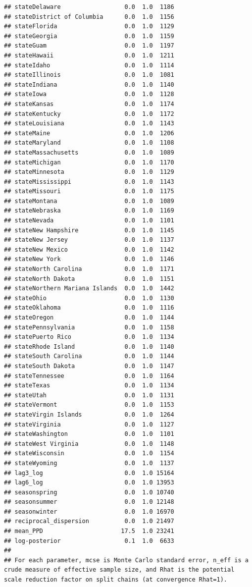 \documentclass[
]{book}
\begin{document}
\begin{verbatim}
## stateDelaware                  0.0  1.0  1186
## stateDistrict of Columbia      0.0  1.0  1156
## stateFlorida                   0.0  1.0  1129
## stateGeorgia                   0.0  1.0  1159
## stateGuam                      0.0  1.0  1197
## stateHawaii                    0.0  1.0  1211
## stateIdaho                     0.0  1.0  1114
## stateIllinois                  0.0  1.0  1081
## stateIndiana                   0.0  1.0  1140
## stateIowa                      0.0  1.0  1128
## stateKansas                    0.0  1.0  1174
## stateKentucky                  0.0  1.0  1172
## stateLouisiana                 0.0  1.0  1143
## stateMaine                     0.0  1.0  1206
## stateMaryland                  0.0  1.0  1108
## stateMassachusetts             0.0  1.0  1089
## stateMichigan                  0.0  1.0  1170
## stateMinnesota                 0.0  1.0  1129
## stateMississippi               0.0  1.0  1143
## stateMissouri                  0.0  1.0  1175
## stateMontana                   0.0  1.0  1089
## stateNebraska                  0.0  1.0  1169
## stateNevada                    0.0  1.0  1101
## stateNew Hampshire             0.0  1.0  1145
## stateNew Jersey                0.0  1.0  1137
## stateNew Mexico                0.0  1.0  1142
## stateNew York                  0.0  1.0  1146
## stateNorth Carolina            0.0  1.0  1171
## stateNorth Dakota              0.0  1.0  1151
## stateNorthern Mariana Islands  0.0  1.0  1442
## stateOhio                      0.0  1.0  1130
## stateOklahoma                  0.0  1.0  1116
## stateOregon                    0.0  1.0  1144
## statePennsylvania              0.0  1.0  1158
## statePuerto Rico               0.0  1.0  1134
## stateRhode Island              0.0  1.0  1140
## stateSouth Carolina            0.0  1.0  1144
## stateSouth Dakota              0.0  1.0  1147
## stateTennessee                 0.0  1.0  1164
## stateTexas                     0.0  1.0  1134
## stateUtah                      0.0  1.0  1131
## stateVermont                   0.0  1.0  1153
## stateVirgin Islands            0.0  1.0  1264
## stateVirginia                  0.0  1.0  1127
## stateWashington                0.0  1.0  1101
## stateWest Virginia             0.0  1.0  1148
## stateWisconsin                 0.0  1.0  1154
## stateWyoming                   0.0  1.0  1137
## lag3_log                       0.0  1.0 15164
## lag6_log                       0.0  1.0 13953
## seasonspring                   0.0  1.0 10740
## seasonsummer                   0.0  1.0 12148
## seasonwinter                   0.0  1.0 16970
## reciprocal_dispersion          0.0  1.0 21497
## mean_PPD                      17.5  1.0 23241
## log-posterior                  0.1  1.0  6633
## 
## For each parameter, mcse is Monte Carlo standard error, n_eff is a crude measure of effective sample size, and Rhat is the potential scale reduction factor on split chains (at convergence Rhat=1).
\end{verbatim}
\end{document}

